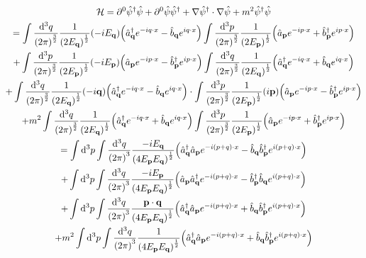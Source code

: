 \documentclass{report}
\theoremstyle{definition}
\begin{document}
\begin{chapter12}
	\begin{gather*}
		\mathcal{H} = \partial^0\hat{\psi}^{\dagger}\hat{\psi} + \partial^0\hat{\psi}\hat{\psi}^{\dagger} + \nabla\hat{\psi}^{\dagger}\cdot\nabla\hat{\psi} + m^2 \hat{\psi}^{\dagger}\hat{\psi} \\
		= \int\frac{\dd^3{q}}{\pqty{2\pi}^{\frac{3}{2}}}\frac{1}{\pqty{2E_{\bf q}}^{\frac{1}{2}}}\pqty{-iE_{\bf q}}\pqty{\hat{a}^{\dagger}_{\bf q}e^{-iq\cdot x} - \hat{b}_{\bf q}e^{iq\cdot x}}\int \frac{\dd^3{p}}{\pqty{2\pi}^{\frac{3}{2}}}\frac{1}{\pqty{2E_{\bf p}}^{\frac{1}{2}}}\pqty{\hat{a}_{\bf p}e^{-ip\cdot x} + \hat{b}^{\dagger}_{\bf p}e^{ip\cdot x}} \\
		+ \int\frac{\dd^3{p}}{\pqty{2\pi}^{\frac{3}{2}}}\frac{1}{\pqty{2E_{\bf p}}^{\frac{1}{2}}}\pqty{-iE_{\bf p}}\pqty{\hat{a}_{\bf p}e^{-ip\cdot x} - \hat{b}^{\dagger}_{\bf p}e^{ip\cdot x}}\int\frac{\dd^3{q}}{\pqty{2\pi}^{\frac{3}{2}}}\frac{1}{\pqty{2E_{\bf q}}^{\frac{1}{2}}}\pqty{\hat{a}^{\dagger}_{\bf q}e^{-iq\cdot x} + \hat{b}_{\bf q}e^{iq\cdot x}}  \\
		+ \int\frac{\dd^3{q}}{\pqty{2\pi}^{\frac{3}{2}}}\frac{1}{\pqty{2E_{\bf q}}^{\frac{1}{2}}}\pqty{-i\bf q}\pqty{\hat{a}^{\dagger}_{\bf q}e^{-iq\cdot x} - \hat{b}_{\bf q}e^{iq\cdot x}} \cdot \int\frac{\dd^3{p}}{\pqty{2\pi}^{\frac{3}{2}}}\frac{1}{\pqty{2E_{\bf p}}^{\frac{1}{2}}}\pqty{i\bf p}\pqty{\hat{a}_{\bf p}e^{-ip\cdot x} - \hat{b}^{\dagger}_{\bf p}e^{ip\cdot x}}\\
		+ m^2 \int\frac{\dd^3{q}}{\pqty{2\pi}^{\frac{3}{2}}}\frac{1}{\pqty{2E_{\bf q}}^{\frac{1}{2}}}\pqty{\hat{a}^{\dagger}_{\bf q}e^{-iq\cdot x} + \hat{b}_{\bf q}e^{iq\cdot x}}\int\frac{\dd^3{p}}{\pqty{2\pi}^{\frac{3}{2}}}\frac{1}{\pqty{2E_{\bf p}}^{\frac{1}{2}}}\pqty{\hat{a}_{\bf p}e^{-ip\cdot x} + \hat{b}^{\dagger}_{\bf p}e^{ip\cdot x}} \\
		= \int\dd^3{p}\int\frac{\dd^3{q}}{\pqty{2\pi}^3}\frac{-iE_{\bf q}}{\pqty{4E_{\bf p}E_{\bf q}}^{\frac{1}{2}}}\pqty{\hat{a}^{\dagger}_{\bf q}\hat{a}_{\bf p}e^{-i(p+q)\cdot x} - \hat{b}_{\bf q}\hat{b}^{\dagger}_{\bf p}e^{i(p+q)\cdot x}} \\
		+ \int\dd^3{p}\int\frac{\dd^3{q}}{\pqty{2\pi}^3}\frac{-iE_{\bf p}}{\pqty{4E_{\bf p}E_{\bf q}}^{\frac{1}{2}}}\pqty{\hat{a}_{\bf p}\hat{a}^{\dagger}_{\bf q}e^{-i(p+q)\cdot x} - \hat{b}^{\dagger}_{\bf p}\hat{b}_{\bf q}e^{i(p+q)\cdot x}} \\
		+ \int\dd^3{p}\int\frac{\dd^3{q}}{\pqty{2\pi}^3}\frac{\bf p \cdot q}{\pqty{4E_{\bf p}E_{\bf q}}^{\frac{1}{2}}}\pqty{\hat{a}^{\dagger}_{\bf q}\hat{a}_{\bf p}e^{-i(p+q)\cdot x} + \hat{b}_{\bf q}\hat{b}^{\dagger}_{\bf p}e^{i(p+q)\cdot x}} \\
		+ m^2 \int\dd^3{p}\int\frac{\dd^3{q}}{\pqty{2\pi}^3}\frac{1}{\pqty{4E_{\bf p}E_{\bf q}}^{\frac{1}{2}}}\pqty{\hat{a}^{\dagger}_{\bf q}\hat{a}_{\bf p}e^{-i(p+q)\cdot x} + \hat{b}_{\bf q}\hat{b}^{\dagger}_{\bf p}e^{i(p+q)\cdot x}}
	\end{gather*}
\end{chapter12}
\end{document}
